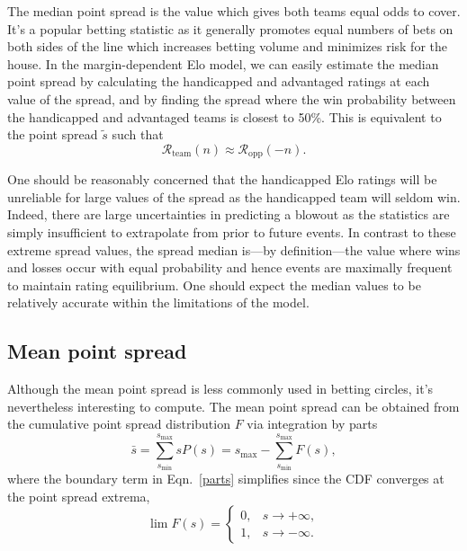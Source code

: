 \documentclass[aps,prc,reprint,amsmath,superscriptaddress,nofootinbib]{revtex4-1}
\newcommand{\R}{\mathcal{R}}
\begin{document}
The median point spread is the value which gives both teams equal odds to cover.
It's a popular betting statistic as it generally promotes equal numbers of bets on both sides of the line which increases betting volume and minimizes risk for the house.
In the margin-dependent Elo model, we can easily estimate the median point spread by calculating the handicapped and advantaged ratings at each value of the spread, and by finding the spread where the win probability between the handicapped and advantaged teams is closest to 50\%.
This is equivalent to the point spread $\tilde{s}$ such that
\begin{equation}
  \R_\text{team}(n) \approx \R_\text{opp}(-n).
\end{equation}

One should be reasonably concerned that the handicapped Elo ratings will be unreliable for large values of the spread as the handicapped team will seldom win.
Indeed, there are large uncertainties in predicting a blowout as the statistics are simply insufficient to extrapolate from prior to future events.
In contrast to these extreme spread values, the spread median is---by definition---the value where wins and losses occur with equal probability and hence events are maximally frequent to maintain rating equilibrium.
One should expect the median values to be relatively accurate within the limitations of the model.

\subsection{Mean point spread}

Although the mean point spread is less commonly used in betting circles, it's nevertheless interesting to compute.
The mean point spread can be obtained from the cumulative point spread distribution $F$ via integration by parts
\begin{equation}
  \label{parts}
  \bar{s} = \sum\limits_{s_\text{min}}^{s_\text{max}} s P(s) = s_\text{max} - \sum\limits_{s_\text{min}}^{s_\text{max}} F(s),
\end{equation}
where the boundary term in Eqn.~\eqref{parts} simplifies since the CDF converges at the point spread extrema,
\begin{equation}
  \lim F(s)=
  \begin{cases}
    0, & s \to +\infty,\\
    1, & s \to -\infty.
  \end{cases}
\end{equation}
\end{document}
